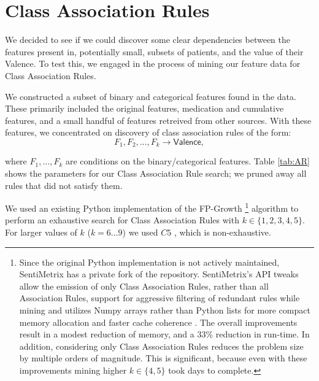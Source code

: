 \chapter{Class Association Rules}\label{sec:assoc-rules} 
 
 We decided to see if we could discover
 some clear dependencies between the features present in,
 potentially small, subsets
 of patients, and the value of their \textsf{Valence}. To test this,
 we engaged in the process of mining our feature data 
 for Class Association Rules.
 
 We constructed a subset of binary and categorical features found in the data.
 These primarily included the original features, medication and cumulative
 features, and a small handful of features retreived from other sources.
 With these features, we concentrated on discovery of class association rules
 of the form:
 $$ F_1,F_2,\ldots, F_k\longrightarrow \mathsf{Valence},$$

\noindent where $F_1,\ldots, F_k$ are conditions on the binary/categorical features. Table \ref{tab:AR}
shows the parameters for our Class Association Rule search; we pruned away all rules that
did not satisfy them.


We used an existing Python implementation \cite{python-fp-growth} of the \textsf{FP-Growth} \footnote{
Since the original Python implementation is not actively maintained, SentiMetrix has a private fork of the repository.
SentiMetrix's API tweaks allow the emission of only Class Association Rules, rather than all Association Rules,
 support for aggressive filtering of redundant rules while mining and utilizes Numpy arrays rather than Python lists for more compact memory allocation and faster cache coherence \cite{numpy}. The overall improvements result in a modest reduction of memory, and a 33\% reduction in run-time. In addition, considering only Class Association Rules reduces the problem size by multiple orders of magnitude. This is significant, because even with these improvements mining higher $k \in \{4, 5\}$ took days to complete. 
 } \cite{fpgrowth} 
algorithm to perform an exhaustive search for Class Association Rules with
$k \in \{1,2,3,4,5\}$.  For larger values of $k$ ($k = 6\ldots 9$) we used
$C5$ \cite{c5,c45}, which is non-exhaustive.

